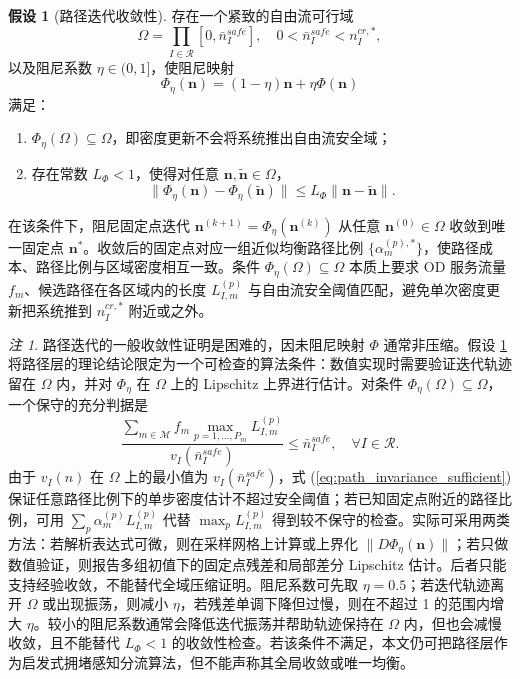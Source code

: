 \documentclass[a4paper,12pt]{article}
\theoremstyle{plain}
\theoremstyle{definition}
\newtheorem{assumption}[theorem]{假设}
\theoremstyle{remark}
\newtheorem{remark}[theorem]{注}
\begin{document}
\begin{assumption}[路径迭代收敛性]\label{asm:path_convergence}
存在一个紧致的自由流可行域
\begin{equation}
    \Omega=\prod_{I\in\mathcal R}[0,\bar n_I^{safe}],
    \quad 0<\bar n_I^{safe}<n_I^{cr,*},
\end{equation}
以及阻尼系数 $\eta\in(0,1]$，使阻尼映射
\begin{equation}\label{eq:damped_fixed_point}
    \Phi_\eta(\bm n)=(1-\eta)\bm n+\eta\Phi(\bm n)
\end{equation}
满足：
\begin{enumerate}
    \item $\Phi_\eta(\Omega)\subseteq\Omega$，即密度更新不会将系统推出自由流安全域；
    \item 存在常数 $L_\Phi<1$，使得对任意 $\bm n,\tilde{\bm n}\in\Omega$，
    \begin{equation}
        \|\Phi_\eta(\bm n)-\Phi_\eta(\tilde{\bm n})\|\le L_\Phi\|\bm n-\tilde{\bm n}\|.
    \end{equation}
\end{enumerate}
在该条件下，阻尼固定点迭代 $\bm n^{(k+1)}=\Phi_\eta(\bm n^{(k)})$ 从任意 $\bm n^{(0)}\in\Omega$ 收敛到唯一固定点 $\bm n^*$。收敛后的固定点对应一组近似均衡路径比例 $\{\alpha_m^{(p),*}\}$，使路径成本、路径比例与区域密度相互一致。条件 $\Phi_\eta(\Omega)\subseteq\Omega$ 本质上要求 OD 服务流量 $f_m$、候选路径在各区域内的长度 $L_{I,m}^{(p)}$ 与自由流安全阈值匹配，避免单次密度更新把系统推到 $n_I^{cr,*}$ 附近或之外。
\end{assumption}

\begin{remark}
路径迭代的一般收敛性证明是困难的，因未阻尼映射 $\Phi$ 通常非压缩。假设 \ref{asm:path_convergence} 将路径层的理论结论限定为一个可检查的算法条件：数值实现时需要验证迭代轨迹留在 $\Omega$ 内，并对 $\Phi_\eta$ 在 $\Omega$ 上的 Lipschitz 上界进行估计。对条件 $\Phi_\eta(\Omega)\subseteq\Omega$，一个保守的充分判据是
\begin{equation}\label{eq:path_invariance_sufficient}
    \frac{\sum_{m\in\mathcal M} f_m \max_{p=1,\ldots,P_m} L_{I,m}^{(p)}}{v_I(\bar n_I^{safe})}
    \le \bar n_I^{safe},
    \quad \forall I\in\mathcal R .
\end{equation}
由于 $v_I(n)$ 在 $\Omega$ 上的最小值为 $v_I(\bar n_I^{safe})$，式 (\ref{eq:path_invariance_sufficient}) 保证任意路径比例下的单步密度估计不超过安全阈值；若已知固定点附近的路径比例，可用 $\sum_p\alpha_m^{(p)}L_{I,m}^{(p)}$ 代替 $\max_p L_{I,m}^{(p)}$ 得到较不保守的检查。实际可采用两类方法：若解析表达式可微，则在采样网格上计算或上界化 $\|D\Phi_\eta(\bm n)\|$；若只做数值验证，则报告多组初值下的固定点残差和局部差分 Lipschitz 估计。后者只能支持经验收敛，不能替代全域压缩证明。阻尼系数可先取 $\eta=0.5$；若迭代轨迹离开 $\Omega$ 或出现振荡，则减小 $\eta$，若残差单调下降但过慢，则在不超过 1 的范围内增大 $\eta$。较小的阻尼系数通常会降低迭代振荡并帮助轨迹保持在 $\Omega$ 内，但也会减慢收敛，且不能替代 $L_\Phi<1$ 的收敛性检查。若该条件不满足，本文仍可把路径层作为启发式拥堵感知分流算法，但不能声称其全局收敛或唯一均衡。
\end{remark}
\end{document}
